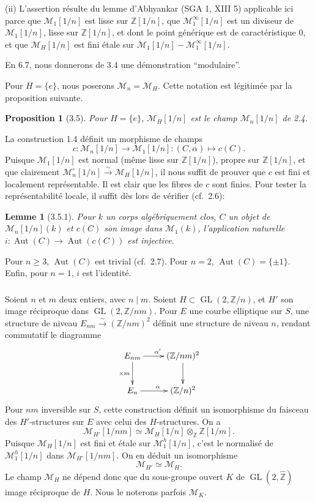 \documentclass[11pt,a4paper]{amsart}
\theoremstyle{plain}
\newtheorem{lemma}[theorem]{Lemme}
\newtheorem{proposition}[theorem]{Proposition}
\theoremstyle{definition}
\DeclareMathOperator{\Aut}{Aut}
\DeclareMathOperator{\Gl}{GL}
\newcommand{\mll}{\mathcal{M}}
\newcommand{\ZZ}{\mathbb{Z}}
\begin{document}
(ii) L'assertion r\'esulte du lemme d'Abhyankar (SGA 1, XIII 5) applicable ici parce que $\mll_1[1/n]$ est lisse sur $\ZZ[1/n]$, que $\mll^{\infty}_1[1/n]$ est un diviseur de $\mll_1[1/n]$, lisse sur $\ZZ[1/n]$, et dont le point g\'en\'erique est de caract\'eristique $0$, et que $\mll_H[1/n]$ est fini \'etale sur $\mll_1[1/n] - \mll^{\infty}_1[1/n]$.

En 6.7, nous donnerons de 3.4 une d\'emonstration ``modulaire''.

Pour $H = \{e\}$, nous poserons $\mll_n = \mll_H$. Cette notation est l\'egitim\'ee par la proposition suivante.

\begin{proposition}[3.5]
Pour $H = \{e\}$, $\mll_H[1/n]$ est le champ $\mll_n[1/n]$ de 2.4.
\end{proposition}

La construction 1.4 d\'efinit un morphisme de champs
\[
c \colon \mll_n[1/n] \longrightarrow \mll_1[1/n] \colon (C, \alpha) \mapsto c(C).
\]
Puisque $\mll_1[1/n]$ est normal (m\^eme lisse sur $\ZZ[1/n]$), propre sur $\ZZ[1/n]$, et que clairement $\mll^{\circ}_n[1/n] \xrightarrow{\sim} \mll_H[1/n]$, il nous suffit de prouver que $c$ est fini et localement repr\'esentable. Il est clair que les fibres de $c$ sont finies. Pour tester la repr\'esentabilit\'e locale, il suffit d\`es lors de v\'erifier (cf.~2.6):

\begin{lemma}[3.5.1]
Pour $k$ un corps alg\'ebriquement clos, $C$ un objet de $\mll_n[1/n](k)$ et $c(C)$ son image dans $\mll_1(k)$, l'application naturelle $i \colon \Aut(C) \to \Aut(c(C))$ est injective.
\end{lemma}

Pour $n \geq 3$, $\Aut(C)$ est trivial (cf.~2.7). Pour $n = 2$, $\Aut(C) = \{\pm 1\}$. Enfin, pour $n=1$, $i$ est l'identit\'e.

\subsubsection{}
Soient $n$ et $m$ deux entiers, avec $n \mid m$. Soient $H \subset \Gl(2, \ZZ/n)$, et $H'$ son image r\'eciproque dans $\Gl(2, \ZZ/nm)$. Pour $E$ une courbe elliptique sur $S$, une structure de niveau $E_{nm} \xrightarrow{\sim} (\ZZ/nm)^2$ d\'efinit une structure de niveau $n$, rendant commutatif le diagramme
\[
\xymatrix{
E_{nm} \ar[r]^{\alpha'} \ar[d]_{\times m} & (\ZZ/nm)^2 \ar[d] \\
E_n \ar[r]^{\alpha} & (\ZZ/n)^2
}
\]
Pour $nm$ inversible sur $S$, cette construction d\'efinit un isomorphisme du faisceau des $H'$-structures sur $E$ avec celui des $H$-structures. On a
\[
\mll_{H'}[1/nm] \simeq \mll_H[1/n] \otimes_{\ZZ} \ZZ[1/m].
\]
Puisque $\mll_H[1/n]$ est fini et \'etale sur $\mll^h_1[1/n]$, c'est le normalis\'e de $\mll^h_1[1/n]$ dans $\mll_{H'}[1/nm]$. On en d\'eduit un isomorphisme
\[
\mll_{H'} \simeq \mll_H.
\]
Le champ $\mll_H$ ne d\'epend donc que du sous-groupe ouvert $K$ de $\Gl(2, \hat{\ZZ})$ image r\'eciproque de $H$. Nous le noterons parfois $\mll_K$.
\end{document}
